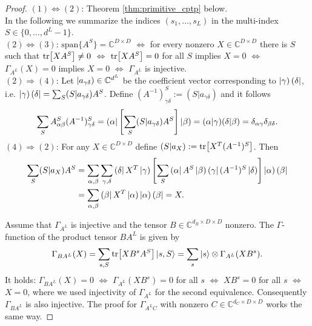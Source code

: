 \begin{proof}
$(1) \Leftrightarrow (2)$: Theorem \ref{thm:primitive_cptp} below. \\

\noindent In the following we summarize the indices $(s_1, \ldots, s_L)$ in the multi-index $S \in \{0, \ldots, d^{L} - 1\}$. \\

\noindent $(2) \Leftrightarrow (3)$:  $\mathrm{span}\{A^S\}= \mathbb{C}^{D \times D}$ $\Leftrightarrow$ for every nonzero $X \in \mathbb{C}^{D \times D}$ there is $S$ such that $\tr[XA^S] \neq 0$ $\Leftrightarrow$ $\tr[XA^S] = 0$ for all $S$ implies $X=0$ $\Leftrightarrow$ $\Gamma_{A^L}(X)=0$ implies $X=0$ $\Leftrightarrow$ $\Gamma_{A^L}$ is injective. \\

\noindent $(2) \Rightarrow (4)$:  Let $\left| a_{\gamma\delta} \right) \in \mathbb{C}^{d^L}$ be the coefficient vector corresponding to $\left| \gamma \right)\left( \delta \right|$, i.e. $\left| \gamma \right)\left( \delta \right| = \sum_S ( S  \vert a_{\gamma\delta} ) A^S$.
Define $(A^{-1})^S_{\gamma\delta} := ( S \vert a_{\gamma\delta} )$ and it follows 
\begin{equation}
	\sum_S A^S_{\alpha\beta} (A^{-1})^S_{\gamma\delta} = \left( \alpha \right| \left[ \sum_S ( S \vert a_{\gamma\delta} ) A^S \right] \left| \beta \right) = ( \alpha \vert \gamma ) ( \delta \vert \beta ) = \delta_{\alpha \gamma} \delta_{\beta \delta}.
\end{equation}
\noindent $(4) \Rightarrow (2)$: For any $X \in \mathbb{C}^{D \times D}$ define $( S \vert a_X ) := \tr[X^T (A^{-1})^S]$. Then 
\begin{align}
\begin{split}
	\sum_S ( S \vert a_{X} ) A^S &= \sum_{\alpha,\beta}\sum_{\gamma,\delta} \left( \delta \right| X^T \left| \gamma \right) \left[ \sum_S \left( \alpha \right|A^S \left| \beta \right)\left( \gamma \right| (A^{-1})^S \left| \delta \right) \right] \left| \alpha \right) \left( \beta \right| \\
	&= \sum_{\alpha,\beta} \left( \beta \right| X^T \left| \alpha \right)\left| \alpha \right)\left( \beta \right| = X. 
\end{split}
\end{align}

\noindent Assume that $\Gamma_{A^L}$ is injective and the tensor $B \in \mathbb{C}^{d_B \times D \times D}$ nonzero. The $\Gamma$-function of the product tensor $B A^L$ is given by
\begin{equation}
	\Gamma_{B A^L}(X) = \sum_{s, S} \tr[X B^s A^S]\ket{s, S} = \sum_s \ket{s} \otimes \Gamma_{A^L}(X B^s).
\end{equation}
It holds: $\Gamma_{B A^L}(X) = 0$ $\Leftrightarrow$ $\Gamma_{A^L}(X B^s) = 0$ for all $s$ $\Leftrightarrow$ $X B^s = 0$ for all $s$ $\Leftrightarrow$ $X=0$, where we used injectivity of $\Gamma_{A^L}$ for the second equivalence. Consequently $\Gamma_{B A^L}$ is also injective. The proof for $\Gamma_{A^L C}$ with nonzero $C \in \mathbb{C}^{d_C \times D \times D}$ works the same way.
\end{proof}

